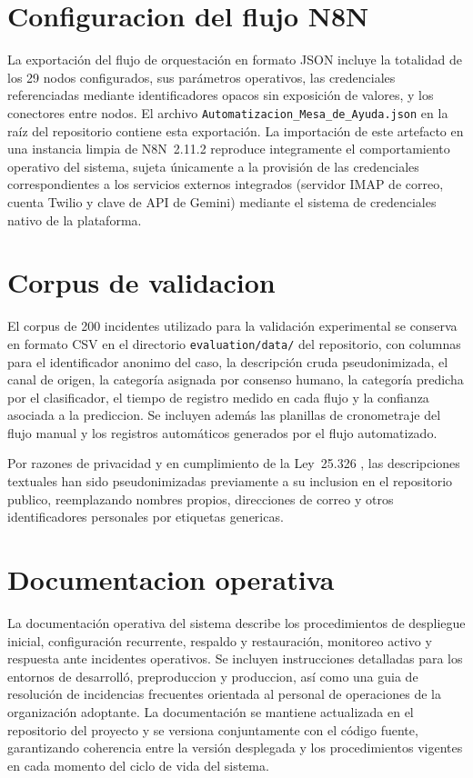 \section{Configuracion del flujo N8N}

La exportación del flujo de orquestación en formato JSON incluye la totalidad de los 29 nodos configurados, sus parámetros operativos, las credenciales referenciadas mediante identificadores opacos sin exposición de valores, y los conectores entre nodos. El archivo \texttt{Automatizacion\_Mesa\_de\_Ayuda.json} en la raíz del repositorio contiene esta exportación. La importación de este artefacto en una instancia limpia de N8N~2.11.2 reproduce integramente el comportamiento operativo del sistema, sujeta únicamente a la provisión de las credenciales correspondientes a los servicios externos integrados (servidor IMAP de correo, cuenta Twilio y clave de API de Gemini) mediante el sistema de credenciales nativo de la plataforma.

\section{Corpus de validacion}

El corpus de 200 incidentes utilizado para la validación experimental se conserva en formato CSV en el directorio \texttt{evaluation/data/} del repositorio, con columnas para el identificador anonimo del caso, la descripción cruda pseudonimizada, el canal de origen, la categoría asignada por consenso humano, la categoría predicha por el clasificador, el tiempo de registro medido en cada flujo y la confianza asociada a la prediccion. Se incluyen además las planillas de cronometraje del flujo manual y los registros automáticos generados por el flujo automatizado.

Por razones de privacidad y en cumplimiento de la Ley~25.326 \parencite{Ley25326_2000}, las descripciones textuales han sido pseudonimizadas previamente a su inclusion en el repositorio publico, reemplazando nombres propios, direcciones de correo y otros identificadores personales por etiquetas genericas.

\section{Documentacion operativa}

La documentación operativa del sistema describe los procedimientos de despliegue inicial, configuración recurrente, respaldo y restauración, monitoreo activo y respuesta ante incidentes operativos. Se incluyen instrucciones detalladas para los entornos de desarrolló, preproduccion y produccion, así como una guia de resolución de incidencias frecuentes orientada al personal de operaciones de la organización adoptante. La documentación se mantiene actualizada en el repositorio del proyecto y se versiona conjuntamente con el código fuente, garantizando coherencia entre la versión desplegada y los procedimientos vigentes en cada momento del ciclo de vida del sistema.

\newpage

